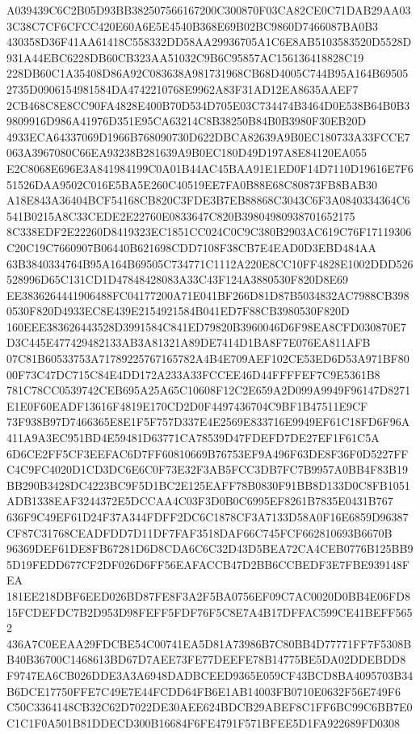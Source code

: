\documentclass[UTF8,fontset=fandol,zihao=-4,a4paper]{ctexart}
\begin{document}
{{A039439C6C2B05D93BB382507566167200C300870F03CA82CE0C71DAB29AA033C38C7CF6CFCC420E60A6E5E4540B368E69B02BC9860D7466087BA0B3
430358D36F41AA61418C558332DD58AA29936705A1C6E8AB5103583520D5528D931A44EBC6228DB60CB323AA51032C9B6C95857AC156136418828C19
228DB60C1A35408D86A92C083638A981731968CB68D4005C744B95A164B695052735D0906154981584DA4742210768E9962A83F31AD12EA8635AAEF7
2CB468C8E8CC90FA4828E400B70D534D705E03C734474B3464D0E538B64B0B39809916D986A41976D351E95CA63214C8B38250B84B0B3980F30EB20D
4933ECA64337069D1966B768090730D622DBCA82639A9B0EC180733A33FCCE7063A3967080C66EA93238B281639A9B0EC180D49D197A8E84120EA055
E2C8068E696E3A841984199C0A01B44AC45BAA91E1ED0F14D7110D19616E7F651526DAA9502C016E5BA5E260C40519EE7FA0B88E68C80873FB8BAB30
A18E843A36404BCF54168CB820C3FDE3B7EB88868C3043C6F3A0840334364C6541B0215A8C33CEDE2E22760E0833647C820B39804980938701652175
8C338EDF2E22260D8419323EC1851CC024C0C9C380B2903AC619C76F17119306C20C19C7660907B06440B621698CDD7108F38CB7E4EAD0D3EBD484AA
63B3840334764B95A164B69505C734771C1112A220E8CC10FF4828E1002DDD526528996D65C131CD1D47848428083A33C43F124A3880530F820D8E69
EE3836264441906488FC04177200A71E041BF266D81D87B5034832AC7988CB3980530F820D4933EC8E439E2154921584B041ED7F88CB3980530F820D
160EEE383626443528D3991584C841ED79820B3960046D6F98EA8CFD030870E7D3C445E477429482133AB3A81321A89DE7414D1BA8F7E076EA811AFB
07C81B60533753A71789225767165782A4B4E709AEF102CE53ED6D53A971BF8000F73C47DC715C84E4DD172A233A33FCCEE46D44FFFFEF7C9E5361B8
781C78CC0539742CEB695A25A65C10608F12C2E659A2D099A9949F96147D8271E1E0F60EADF13616F4819E170CD2D0F4497436704C9BF1B47511E9CF
73F938B97D7466365E8E1F5F757D337E4E2569E833716E9949EF61C18FD6F96A411A9A3EC951BD4E59481D63771CA78539D47FDEFD7DE27EF1F61C5A
6D6CE2FF5CF3EEFAC6D7FF60810669B76753EF9A496F63DE8F36F0D5227FFC4C9FC4020D1CD3DC6E6C0F73E32F3AB5FCC3DB7FC7B9957A0BB4F83B19
BB290B3428DC4223BC9F5D1BC2E125EAFF78B0830F91BB8D133D0C8FB1051ADB1338EAF3244372E5DCCAA4C03F3D0B0C6995EF8261B7835E0431B767
636F9C49EF61D24F37A344FDFF2DC6C1878CF3A7133D58A0F16E6859D96387CF87C31768CEADFDD7D11DF7FAF3518DAF66C745FCF662810693B6670B
96369DEF61DE8FB67281D6D8CDA6C6C32D43D5BEA72CA4CEB0776B125BB95D19FEDD677CF2DF026D6FF56EAFACCB47D2BB6CCBEDF3E7FBE939148FEA
181EE218DBF6EED026BD87FE8F3A2F5BA0756EF09C7AC0020D0BB4E06FD815FCDEFDC7B2D953D98FEFF5FDF76F5C8E7A4B17DFFAC599CE41BEFF5652
436A7C0EEAA29FDCBE54C00741EA5D81A73986B7C80BB4D77771FF7F5308BB40B36700C1468613BD67D7AEE73FE77DEEFE78B14775BE5DA02DDEBDD8
F9747EA6CB026DDE3A3A6948DADBCEED9365E059CF43BCD8BA4095703B34B6DCE17750FFE7C49E7E44FCDD64FB6E1AB14003FB0710E0632F56E749F6
C50C3364148CB32C62D7022DE30AEE624BDCB29ABEF8C1FF6BC99C6BB7E0C1C1F0A501B81DDECD300B16684F6FE4791F571BFEE5D1FA922689FD0308
}}
\end{document}
